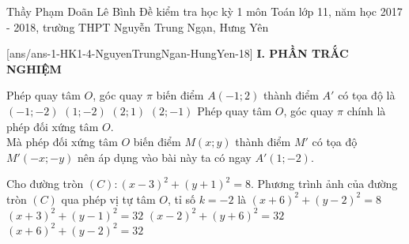 
	\begin{name}
		{Thầy Phạm Doãn Lê Bình}
		{Đề kiểm tra học kỳ 1 môn Toán lớp 11, năm học 2017 - 2018, trường THPT Nguyễn Trung Ngạn, Hưng Yên}
	\end{name}
	\setcounter{ex}{0}\setcounter{bt}{0}
	[ans/ans-1-HK1-4-NguyenTrungNgan-HungYen-18]
\noindent\textbf{I. PHẦN TRẮC NGHIỆM}
\begin{ex}%
	Phép quay tâm $O$, góc quay $\pi$ biến điểm $A(-1;2)$ thành điểm $A'$ có tọa độ là
	\choice
	{$(-1;-2)$}
	{\True $(1;-2)$}
	{$(2;1)$}
	{$(2;-1)$}
	\loigiai
	{ 
	Phép quay tâm $O$, góc quay $\pi$ chính là phép đối xứng tâm $O$. \\
	Mà phép đối xứng tâm $O$ biến điểm $M(x;y)$ thành điểm $M'$ có tọa độ $M'(-x;-y)$ nên áp dụng vào bài này ta có ngay $A'(1;-2)$.
	}
\end{ex}

\begin{ex}%
	Cho đường tròn $(C): (x-3)^2 + (y+1)^2 = 8$. Phương trình ảnh của đường tròn $(C)$ qua phép vị tự tâm $O$, tỉ số $k=-2$ là
	\choice
	{$(x+6)^2+(y-2)^2=8$}
	{$(x+3)^2+(y-1)^2=32$}
	{$(x-2)^2 + (y+6)^2 = 32$}
	{\True $(x+6)^2 + (y-2)^2 =32$}
\end{ex}


